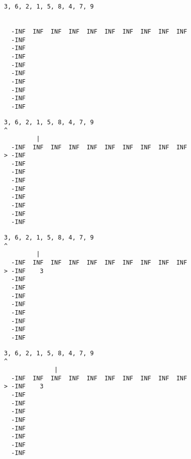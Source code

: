 { \begin{verbatim}
3, 6, 2, 1, 5, 8, 4, 7, 9


  -INF  INF  INF  INF  INF  INF  INF  INF  INF  INF
  -INF                                             
  -INF                                             
  -INF                                             
  -INF                                             
  -INF                                             
  -INF                                             
  -INF                                             
  -INF                                             
  -INF                                             
\end{verbatim} }

{ \begin{verbatim}
3, 6, 2, 1, 5, 8, 4, 7, 9
^
         |
  -INF  INF  INF  INF  INF  INF  INF  INF  INF  INF
> -INF                                             
  -INF                                             
  -INF                                             
  -INF                                             
  -INF                                             
  -INF                                             
  -INF                                             
  -INF                                             
  -INF                                             
\end{verbatim} }

{ \begin{verbatim}
3, 6, 2, 1, 5, 8, 4, 7, 9
^
         |
  -INF  INF  INF  INF  INF  INF  INF  INF  INF  INF
> -INF    3                                        
  -INF                                             
  -INF                                             
  -INF                                             
  -INF                                             
  -INF                                             
  -INF                                             
  -INF                                             
  -INF                                             
\end{verbatim} }

{ \begin{verbatim}
3, 6, 2, 1, 5, 8, 4, 7, 9
^
              |
  -INF  INF  INF  INF  INF  INF  INF  INF  INF  INF
> -INF    3                                        
  -INF                                             
  -INF                                             
  -INF                                             
  -INF                                             
  -INF                                             
  -INF                                             
  -INF                                             
  -INF                                             
\end{verbatim} }


